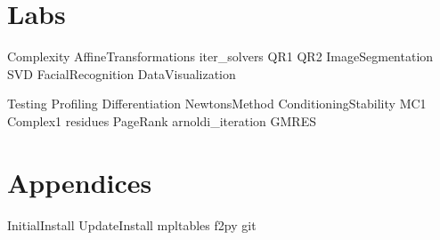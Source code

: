\documentclass[nociteref]{SIAM-GH-book}
\begin{document}
\part{Labs} %
{Complexity}
{AffineTransformations}
{iter_solvers}
{QR1}
{QR2}
{ImageSegmentation}
{SVD}
{FacialRecognition}
{DataVisualization}

{Testing}
{Profiling}
{Differentiation}
{NewtonsMethod} %
{ConditioningStability}
{MC1}
{Complex1}
{residues}
{PageRank}
{arnoldi_iteration}
{GMRES}


\part{Appendices} %
\begin{appendices}
{InitialInstall}
{UpdateInstall}
{mpltables}
{f2py}
{git}
\end{appendices}
\end{document}
